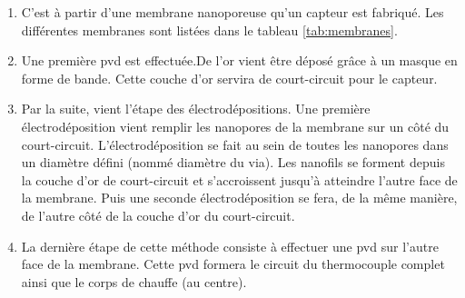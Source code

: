 \begin{itemize}
          \noindent \begin{enumerate}[label=(\alph*), wide, labelwidth=!, labelindent = 0pt]
              \item C'est à partir d'une membrane nanoporeuse qu'un capteur est fabriqué. Les différentes membranes sont listées dans le tableau
                    \ref{tab:membranes}. \\
              \item Une première \gls{pvd} est effectuée.De l'or vient être déposé grâce à un masque en forme de bande.
                    Cette couche d'or servira de court-circuit pour le capteur. \\
              \item Par la suite, vient l'étape des électrodépositions. Une première électrodéposition vient remplir les nanopores de la membrane
                    sur un côté du court-circuit. L'électrodéposition se fait au sein de toutes les nanopores dans un diamètre défini (nommé diamètre du via). 
                    Les nanofils se forment depuis la couche d'or de court-circuit et s'accroissent jusqu'à atteindre l'autre face de la membrane. 
                    Puis une seconde électrodéposition se fera, de la même manière, de l'autre côté de la couche d'or du court-circuit. \\
              \item La dernière étape de cette méthode consiste à effectuer une \gls{pvd} sur l'autre face de la membrane. Cette \gls{pvd} formera
                    le circuit du thermocouple complet ainsi que le corps de chauffe (au centre). 
          \end{enumerate}
          

\end{itemize}
